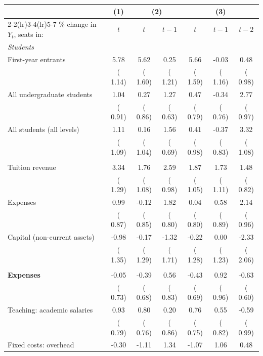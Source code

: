 \begin{tabular}{l*{6}{c}}
\toprule
 & (1) & \multicolumn{2}{c}{(2)} & \multicolumn{3}{c}{(3)} \\
\cmidrule(lr){2-2}\cmidrule(lr){3-4}\cmidrule(lr){5-7}
\% change in \(Y_t\), seats in: & \(t\) & \(t\) & \(t-1\) & \(t\) & \(t-1\) & \(t-2\) \\
\midrule
\multicolumn{7}{l}{\textit{Students}} \\
First-year entrants &   5.78\sym{***} &   5.62\sym{***} &   0.25 &   5.66\sym{***} &  -0.03 &   0.48 \\
 & ( 1.14) & ( 1.60) & ( 1.21) & ( 1.59) & ( 1.16) & ( 0.98) \\
All undergraduate students &   1.04 &   0.27 &   1.27\sym{**} &   0.47 &  -0.34 &   2.77\sym{***} \\
 & ( 0.91) & ( 0.86) & ( 0.63) & ( 0.79) & ( 0.76) & ( 0.97) \\
All students (all levels) &   1.11 &   0.16 &   1.56\sym{**} &   0.41 &  -0.37 &   3.32\sym{***} \\
 & ( 1.09) & ( 1.04) & ( 0.69) & ( 0.98) & ( 0.83) & ( 1.08) \\
\addlinespace
\multicolumn{7}{l}{\textit{University totals}} \\
Tuition revenue &   3.34\sym{***} &   1.76 &   2.59\sym{***} &   1.87\sym{*} &   1.73 &   1.48\sym{*} \\
 & ( 1.29) & ( 1.08) & ( 0.98) & ( 1.05) & ( 1.11) & ( 0.82) \\
Expenses &   0.99 &  -0.12 &   1.82\sym{**} &   0.04 &   0.58 &   2.14\sym{**} \\
 & ( 0.87) & ( 0.85) & ( 0.80) & ( 0.80) & ( 0.89) & ( 0.96) \\
Capital (non-current assets) &  -0.98 &  -0.17 &  -1.32 &  -0.22 &   0.00 &  -2.33 \\
 & ( 1.35) & ( 1.29) & ( 1.71) & ( 1.28) & ( 1.23) & ( 2.06) \\
\addlinespace
\multicolumn{7}{l}{\textit{Per undergraduate student}} \\
\textbf{Expenses} &  -0.05 &  -0.39 &   0.56 &  -0.43 &   0.92 &  -0.63 \\
 & ( 0.73) & ( 0.68) & ( 0.83) & ( 0.69) & ( 0.96) & ( 0.60) \\
\quad Teaching: academic salaries &   0.93 &   0.80 &   0.20 &   0.76 &   0.55 &  -0.59 \\
 & ( 0.79) & ( 0.76) & ( 0.86) & ( 0.75) & ( 0.82) & ( 0.99) \\
\quad Fixed costs: overhead &  -0.30 &  -1.11 &   1.34 &  -1.07 &   1.06 &   0.48 \\

\end{tabular}
